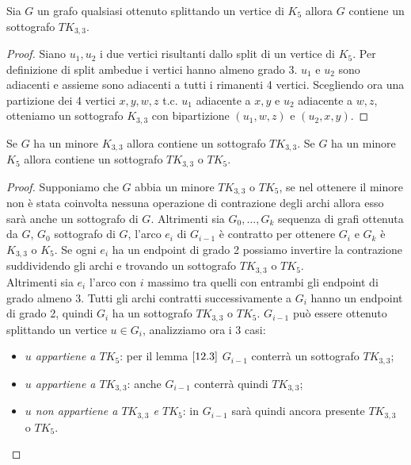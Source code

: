 \begin{lemma}\label{12.3}
    Sia \(G\) un grafo qualsiasi ottenuto splittando un vertice di \(K_5\) allora \(G\) contiene un sottografo \(TK_{3,3}\).
    \begin{proof}
        Siano \(u_1, u_2\) i due vertici risultanti dallo split di un vertice di \(K_5\). Per definizione di split ambedue i vertici hanno almeno grado 3. \(u_1\) e \(u_2\) sono adiacenti e assieme sono adiacenti a tutti i rimanenti 4 vertici. Scegliendo ora una partizione dei 4 vertici \(x,y,w,z\) t.c. \(u_1\) adiacente a \(x,y\) e \(u_2\) adiacente a \(w,z\), otteniamo un sottografo \(K_{3,3}\) con bipartizione \((u_1, w, z)\) e \((u_2,x,y)\).
    \end{proof}
\end{lemma}

\begin{teorema}\label{minoreTK5}
    Se \(G\) ha un minore \(K_{3,3}\) allora contiene un sottografo \(TK_{3,3}\). Se \(G\) ha un minore \(K_5\) allora contiene un sottografo \(TK_{3,3}\) o \(TK_5\).
    \begin{proof}
        Supponiamo che \(G\) abbia un minore \(TK_{3,3}\) o \(TK_5\), se nel ottenere il minore non è stata coinvolta nessuna operazione di contrazione degli archi allora esso sarà anche un sottografo di \(G\). Altrimenti sia \(G_0,\dots, G_k\) sequenza di grafi ottenuta da \(G\), \(G_0\) sottografo di \(G\), l'arco \(e_i\) di \(G_{i-1}\) è contratto per ottenere \(G_i\) e \(G_k\) è \(K_{3,3}\) o \(K_5\).
        Se ogni \(e_i\) ha un endpoint di grado 2 possiamo invertire la contrazione suddividendo gli archi e trovando un sottografo \(TK_{3,3}\) o \(TK_5\). 
        \\ Altrimenti sia \(e_i\) l'arco con \(i\) massimo tra quelli con entrambi gli endpoint di grado almeno 3. Tutti gli archi contratti successivamente a \(G_i\) hanno un endpoint di grado 2, quindi \(G_i\) ha un sottografo \(TK_{3,3}\) o \(TK_5\). \(G_{i-1}\) può essere ottenuto splittando un vertice \(u \in G_i\), analizziamo ora i 3 casi:
        \begin{itemize}
            \item \textit{\(u\) appartiene a \(TK_5\)}: per il lemma \(\ref{12.3}\) \(G_{i-1}\) conterrà un sottografo \(TK_{3,3}\);
            \item \textit{\(u\) appartiene a \(TK_{3,3}\)}: anche \(G_{i-1}\) conterrà quindi \(TK_{3,3}\);
            \item \textit{\(u\) non appartiene a \(TK_{3,3}\) e \(TK_5\)}: in \(G_{i-1}\) sarà quindi ancora presente \(TK_{3,3}\) o \(TK_5\).
        \end{itemize}
    \end{proof}
\end{teorema}

